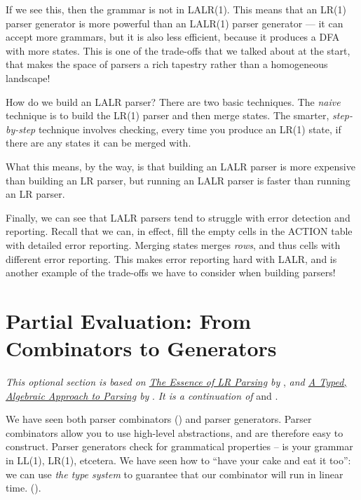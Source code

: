 If we see this, then the grammar is not in LALR(1). This means that an LR(1) parser generator is more powerful than an LALR(1) parser generator --- it can accept more grammars, but it is also less efficient, because it produces a DFA with more states. This is one of the trade-offs that we talked about at the start, that makes the space of parsers a rich tapestry rather than a homogeneous landscape!

How do we build an LALR parser? There are two basic techniques. The \textit{naive} technique is to build the LR(1) parser and then merge states. The smarter, \textit{step-by-step} technique involves checking, every time you produce an LR(1) state, if there are any states it can be merged with. 

What this means, by the way, is that building an LALR parser is more expensive than building an LR parser, but running an LALR parser is faster than running an LR parser.

Finally, we can see that LALR parsers tend to struggle with error detection and reporting. Recall that we can, in effect, fill the empty cells in the ACTION table with detailed error reporting. Merging states merges \textit{rows}, and thus cells with different error reporting. This makes error reporting hard with LALR, and is another example of the trade-offs we have to consider when building parsers!

\section{Partial Evaluation: From Combinators to Generators\optional}\label{section:partial-evaluation}
\textit{This optional section is based on \href{https://dl.acm.org/doi/pdf/10.1145/215465.215579}{The Essence of LR Parsing} by} \citet{sperber-1995}, \textit{and \href{https://www.cl.cam.ac.uk/~jdy22/papers/a-typed-algebraic-approach-to-parsing.pdf}{A Typed, Algebraic Approach to Parsing} by} \citet{krishnaswami-2019}. \textit{It is a continuation of}  and .

We have seen both parser combinators () and parser generators. Parser combinators allow you to use high-level abstractions, and are therefore easy to construct. Parser generators check for grammatical properties -- is your grammar in LL(1), LR(1), etcetera. We have seen how to ``have your cake and eat it too'': we can use \textit{the type system} to guarantee that our combinator will run in linear time. (). 

